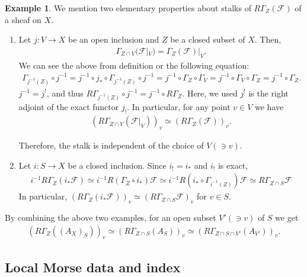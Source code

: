\documentclass[a4paper,dvipdfmx,reqno,12pt]{amsart}
\theoremstyle{definition}
\newtheorem{example}[theorem]{Example}
\newcommand{\mcal}[1]{\mathcal{#1}}%
\numberwithin{equation}{section}
\begin{document}
\begin{example}

We mention two elementary properties 
about stalks of $R\Gamma_{Z}(\mcal{F})$ of a sheaf on 
$X$.

\begin{enumerate}
\item Let $j:V\to X$ be an open inclusion and $Z$ be a 
closed subset of $X$. Then, 
\begin{align}
\Gamma_{Z\cap V}(\mathcal{F}|_V)=\Gamma_{Z}(\mathcal{F})|_V.
\end{align}
We can see the above from definition or the following 
equation:
\begin{align}
\Gamma_{j^{-1}(Z)} \circ j^{-1}
=j^{-1}\circ j_*\circ \Gamma_{j^{-1}(Z)} \circ j^{-1}
=j^{-1}\circ\Gamma_{Z}\circ \Gamma_V
=j^{-1}\circ \Gamma_V \circ \Gamma_Z
=j^{-1} \circ \Gamma_Z.
\end{align}
$j^{-1}=j^{!}$, and thus 
$R\Gamma_{j^{-1}(Z)} \circ j^{-1}=j^{-1}\circ R\Gamma_Z$.
Here, we used $j^{!}$ is the right adjoint of 
the exact functor $j_!$.
In particular, for any point $v\in V$ we have
\begin{align}
(R\Gamma_{Z\cap V}(\mcal{F}|_{V}))_v\simeq 
(R\Gamma_{Z}(\mcal{F}))_v.
\end{align}



Therefore, the stalk is independent of 
the choice of $V (\ni v)$.
\item Let $i: S\to X$ be a closed inclusion.
Since $i_!=i_*$ and $i_!$ is exact,
\begin{align}
  i^{-1}R\Gamma_{Z}(i_*\mcal{F})\simeq 
i^{-1}R(\Gamma_{Z}\circ i_*)\mcal{F}
  \simeq i^{-1}R(i_*\circ \Gamma_{i^{-1}(Z)})\mcal{F}
  \simeq R\Gamma_{Z\cap S}\mcal{F}
\end{align}
In particular, $(R\Gamma_{Z}(i_*\mcal{F}))_v
  \simeq (R\Gamma_{Z\cap S}\mcal{F})_v$ for $v\in S$.
\end{enumerate}

By combining the above two examples, for an open 
subset $V' (\ni v)$ of $S$ we get 
\begin{align} \label{equation-local-stalk}
(R\Gamma_{Z}((A_{X})_S))_v\simeq 
(R\Gamma_{Z\cap S}(A_{S}))_v\simeq
(R\Gamma_{Z\cap S\cap V'}(A_{V'}))_v.
\end{align}

\end{example}




\subsection{Local Morse data and index}
\end{document}
